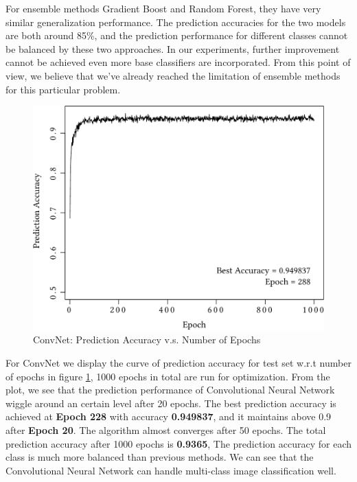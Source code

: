 \documentclass[11pt,oneside,a4paper]{article}
\numberwithin{equation}{section}
\begin{document}
For ensemble methods Gradient Boost and Random Forest, they have very similar generalization performance. The prediction accuracies for the two models are both around 85\%, and the prediction performance for different classes cannot be balanced by these two approaches. In our experiments, further improvement cannot be achieved even more base classifiers are incorporated. From this point of view, we believe that we've already reached the limitation of ensemble methods for this particular problem.

\begin{figure}[ht!]
\centering
\includegraphics[width=0.6\linewidth]{convnet-pred-acc.pdf}
\caption{ConvNet: Prediction Accuracy v.s. Number of Epochs}
\label{fig:cnn}
\end{figure}

For ConvNet we display the curve of prediction accuracy for test set w.r.t number of epochs in figure \ref{fig:cnn}, 1000 epochs in total are run for optimization. From the plot, we see that the prediction performance of Convolutional Neural Network wiggle around an certain level after 20 epochs. The best prediction accuracy is achieved at \textbf{Epoch 228} with accuracy \textbf{0.949837}, and it maintains above 0.9 after \textbf{Epoch 20}. The algorithm almost converges after 50 epochs. The total prediction accuracy after 1000 epochs is \textbf{0.9365}, The prediction accuracy for each class is much more balanced than previous methods. We can see that the Convolutional Neural Network can handle multi-class image classification well.
\end{document}
